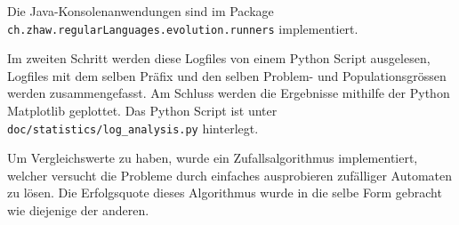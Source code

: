 Die Java-Konsolenanwendungen sind im Package \lstinline$ch.zhaw.regularLanguages.evolution.runners$ implementiert.

Im zweiten Schritt werden diese Logfiles von einem Python Script ausgelesen, Logfiles mit dem selben Präfix und den selben Problem- und Populationsgrössen werden zusammengefasst. Am Schluss werden die Ergebnisse mithilfe der Python Matplotlib \cite{matplotlib} geplottet. Das Python Script ist unter \lstinline$doc/statistics/log_analysis.py$ hinterlegt.

Um Vergleichswerte zu haben, wurde ein Zufallsalgorithmus implementiert, welcher versucht die Probleme durch einfaches ausprobieren zufälliger Automaten zu lösen. Die Erfolgsquote dieses Algorithmus wurde in die selbe Form gebracht wie diejenige der anderen.